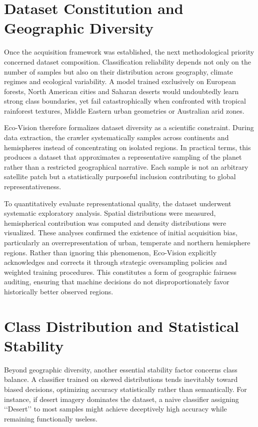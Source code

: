 \documentclass[12pt,a4paper]{report}
\begin{document}
\section{Dataset Constitution and Geographic Diversity}

Once the acquisition framework was established, the next methodological priority concerned dataset composition. Classification reliability depends not only on the number of samples but also on their distribution across geography, climate regimes and ecological variability. A model trained exclusively on European forests, North American cities and Saharan deserts would undoubtedly learn strong class boundaries, yet fail catastrophically when confronted with tropical rainforest textures, Middle Eastern urban geometries or Australian arid zones.

Eco-Vision therefore formalizes dataset diversity as a scientific constraint. During data extraction, the crawler systematically samples across continents and hemispheres instead of concentrating on isolated regions. In practical terms, this produces a dataset that approximates a representative sampling of the planet rather than a restricted geographical narrative. Each sample is not an arbitrary satellite patch but a statistically purposeful inclusion contributing to global representativeness.

To quantitatively evaluate representational quality, the dataset underwent systematic exploratory analysis. Spatial distributions were measured, hemispherical contribution was computed and density distributions were visualized. These analyses confirmed the existence of initial acquisition bias, particularly an overrepresentation of urban, temperate and northern hemisphere regions. Rather than ignoring this phenomenon, Eco-Vision explicitly acknowledges and corrects it through strategic oversampling policies and weighted training procedures. This constitutes a form of geographic fairness auditing, ensuring that machine decisions do not disproportionately favor historically better observed regions.

\section{Class Distribution and Statistical Stability}

Beyond geographic diversity, another essential stability factor concerns class balance. A classifier trained on skewed distributions tends inevitably toward biased decisions, optimizing accuracy statistically rather than semantically. For instance, if desert imagery dominates the dataset, a naive classifier assigning ‘‘Desert’’ to most samples might achieve deceptively high accuracy while remaining functionally useless.
\end{document}
